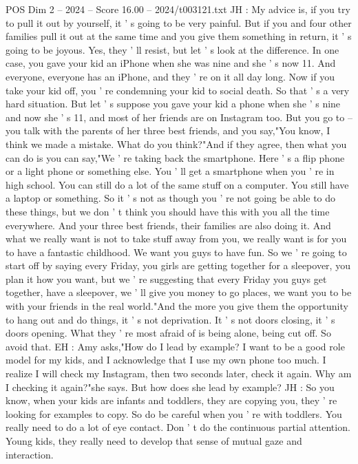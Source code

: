 \begin{textsample}{POS Dim 2 – 2024 – Score 16.00 – 2024/t003121.txt}
JH : My advice is, if you try to pull it out by yourself, it ' s going to be very painful.
But if you and four other families pull it out at the same time and you give them something in return, it ' s going to be joyous.
Yes, they ' ll resist, but let ' s look at the difference.
In one case, you gave your kid an iPhone when she was nine and she ' s now 11.
And everyone, everyone has an iPhone, and they ' re on it all day long.
Now if you take your kid off, you ' re condemning your kid to social death.
So that ' s a very hard situation.
But let ' s suppose you gave your kid a phone when she ' s nine and now she ' s 11, and most of her friends are on Instagram too.
But you go to -- you talk with the parents of her three best friends, and you say,"You know, I think we made a mistake.
What do you think?"And if they agree, then what you can do is you can say,"We ' re taking back the smartphone.
Here ' s a flip phone or a light phone or something else.
You ' ll get a smartphone when you ' re in high school.
You can still do a lot of the same stuff on a computer.
You still have a laptop or something.
So it ' s not as though you ' re not going be able to do these things, but we don ' t think you should have this with you all the time everywhere.
And your three best friends, their families are also doing it.
And what we really want is not to take stuff away from you, we really want is for you to have a fantastic childhood.
We want you guys to have fun.
So we ' re going to start off by saying every Friday, you girls are getting together for a sleepover, you plan it how you want, but we ' re suggesting that every Friday you guys get together, have a sleepover, we ' ll give you money to go places, we want you to be with your friends in the real world."And the more you give them the opportunity to hang out and do things, it ' s not deprivation.
It ' s not doors closing, it ' s doors opening.
What they ' re most afraid of is being alone, being cut off.
So avoid that.
EH : Amy asks,"How do I lead by example?
I want to be a good role model for my kids, and I acknowledge that I use my own phone too much.
I realize I will check my Instagram, then two seconds later, check it again.
Why am I checking it again?"she says.
But how does she lead by example?
JH : So you know, when your kids are infants and toddlers, they are copying you, they ' re looking for examples to copy.
So do be careful when you ' re with toddlers.
You really need to do a lot of eye contact.
Don ' t do the continuous partial attention.
Young kids, they really need to develop that sense of mutual gaze and interaction.

\end{textsample}

